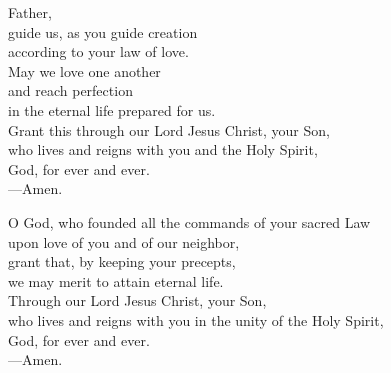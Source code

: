 \prayer


\begin{prayerverse}
Father,\\
guide us, as you guide creation\\
according to your law of love.\\
May we love one another\\
and reach perfection\\
in the eternal life prepared for us.\\
Grant this through our Lord Jesus Christ, your Son,\\
who lives and reigns with you and the Holy Spirit,\\
God, for ever and ever.\\
{\color{red}---\thinspace}Amen.
\end{prayerverse}


\begin{prayerverse}
O God, who founded all the commands of your sacred Law\\
upon love of you and of our neighbor,\\
grant that, by keeping your precepts,\\
we may merit to attain eternal life.\\
Through our Lord Jesus Christ, your Son,\\
who lives and reigns with you in the unity of the Holy Spirit,\\
God, for ever and ever.\\
{\color{red}---\thinspace}Amen.
\end{prayerverse}

